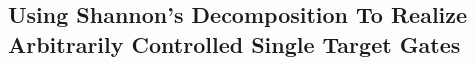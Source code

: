 \documentclass[paper]{ieice}
\providecommand{\DIFaddend}{} %
\DeclareRobustCommand{\DIFaddend}{\DIFOaddend \let\includegraphics\DIFOincludegraphics} %
\begin{document}
\DIFaddend %
%         
%         

\subsection{Using Shannon's Decomposition To Realize Arbitrarily Controlled Single Target Gates}
\label{Subsec:shannon}
\end{document}
